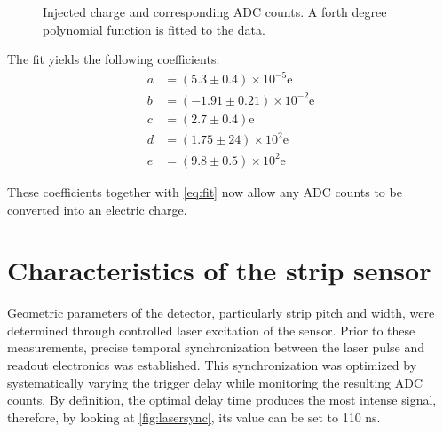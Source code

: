 \begin{figure}[H]
	\centering
	\caption{Injected charge and corresponding ADC counts. A forth degree polynomial function is fitted to the data.}
	\label{fig:polyfit}
\end{figure}

The fit yields the following coefficients:
\begin{align*}
a &= (5.3 \pm 0.4) \times 10^{-5}  \text{e} \\
b &= (-1.91 \pm 0.21) \times 10^{-2}  \text{e} \\
c &= (2.7 \pm 0.4)  \text{e} \\
d &= (1.75 \pm 24) \times 10^{2} \text{e} \\
e &= (9.8 \pm 0.5) \times 10^{2}  \text{e}
\end{align*}

These coefficients together with \cref{eq:fit} now allow any ADC counts to be converted into an electric charge.
\section{Characteristics of the strip sensor}

Geometric parameters of the detector, particularly strip pitch and width, were determined through controlled laser excitation of the sensor. Prior to these measurements, precise temporal synchronization between the laser pulse and readout electronics was established. This synchronization was optimized by systematically varying the trigger delay while monitoring the resulting ADC counts. By definition, the optimal delay time produces the most intense signal, therefore, by looking at \autoref{fig:lasersync}, its value can be set to 110 ns.

